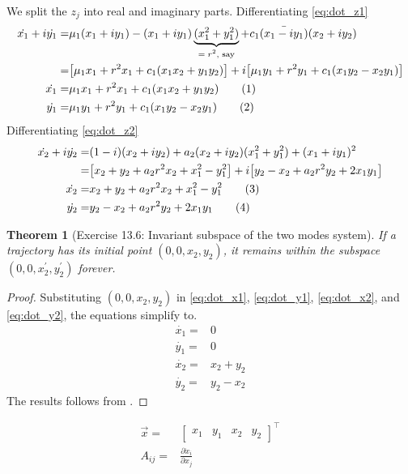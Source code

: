 \documentclass[]{article}
\newcommand\numberthis{\addtocounter{equation}{1}\tag{\theequation}}
\newtheorem{thm}{Theorem}
\begin{document}
We split the $z_j$ into real and imaginary parts. Differentiating \eqref{eq:dot_z1}
\begin{align*}
	\dot{x_1} + i\dot{y_1}=& \mu_1(x_1+i y_1) - (x_1+i y_1)  \underbrace{(x_1^2+ y_1^2)}_\text{$= r^2$, say}  + c_1 \bar{(x_1-i y_1)} (x_2+i y_2)\\
	=& \big[\mu_1 x_1 + r^2 x_1 +c_1(x_1x_2+y_1y_2)\big]+ i\big[\mu_1y_1 + r^2 y_1 +c_1(x_1y_2-x_2y_1)\big]\\
	\dot{x_1} =&\mu_1 x_1 + r^2 x_1 +c_1(x_1x_2+y_1y_2)  \numberthis \label{eq:dot_x1}\\
	\dot{y_1}=& \mu_1y_1 + r^2 y_1 +c_1(x_1y_2-x_2y_1)  \numberthis \label{eq:dot_y1}
\end{align*}
Differentiating \eqref{eq:dot_z2}
\begin{align*}
	\dot{x_2} + i\dot{y_2} =& (1-i)(x_2+i y_2) + a_2(x_2+i y_2) (x_1^2+ y_1^2)+(x_1+i y_1)^2\\
	=& \big[x_2+y_2 + a_2 r^2 x_2 +x_1^2-y_1^2\big] + i\big[y_2-x_2+a_2 r^2 y_2 + 2 x_1y_1\big]\\
	\dot{x_2} =&x_2+y_2 + a_2 r^2 x_2 +x_1^2-y_1^2 \numberthis \label{eq:dot_x2}\\
	\dot{y_2}=& y_2-x_2+a_2 r^2 y_2 + 2 x_1y_1  \numberthis \label{eq:dot_y2}
\end{align*}

\begin{thm}[Exercise 13.6: Invariant subspace of the two modes system]
	If a trajectory has its initial point $(0,0,x_2,y_2)$, it remains within the subspace $(0,0,x_2^\prime,y_2^\prime)$ forever.
\end{thm}

\begin{proof}
	Substituting $(0,0,x_2,y_2)$ in \eqref{eq:dot_x1}, \eqref{eq:dot_y1}, \eqref{eq:dot_x2}, and \eqref{eq:dot_y2}, the equations simplify to.
	\begin{align*}
		\dot{x_1} =&0  \\
		\dot{y_1}=& 0 \\
		\dot{x_2} =&x_2+y_2  \\
		\dot{y_2}=& y_2-x_2
	\end{align*}
The results follows from \cite[Theorem 3]{hurewicz1958lectures}.
\end{proof}

\begin{align*}
	\vec{x}=& \begin{bmatrix}
		x_1&y_1&x_2&y_2
	\end{bmatrix}^\top\\
	A_{ij} =&\frac{\partial \dot{x}_i}{\partial x_j}
\end{align*}
\end{document}
